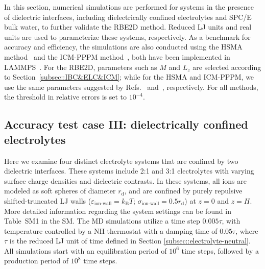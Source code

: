 In this section, numerical simulations are performed for systems in the presence of dielectric interfaces, including dielectrically confined electrolytes and SPC/E bulk water, to further validate the RBE2D method.  {Reduced LJ units and real units are used to parameterize these systems, respectively.}
As a benchmark for accuracy and efficiency, the simulations are also  conducted using the HSMA method~\cite{liang2020harmonic} and the ICM-PPPM method~\cite{yuan2021particle}, both have been implemented in LAMMPS~\cite{liang2022hsma}. 
For the RBE2D, parameters such as $M$ and $L_z$ are selected according to Section~\ref{subsec::IBC&ELC&ICM}; while
for the HSMA and ICM-PPPM, we use the same parameters suggested by Refs.~\cite{liang2020harmonic} and~\cite{yuan2021particle}, respectively. For all methods, the threshold in  relative errors is set to $10^{-4}$.

\subsection{Accuracy test case III: dielectrically confined electrolytes}

Here we examine four distinct electrolyte systems that are confined by two dielectric interfaces.
These systems include 2:1 and 3:1 electrolytes with varying surface charge densities and dielectric contrasts.
In these systems, all ions are modeled as soft spheres of diameter $r_{\text{d}}$, and are confined by purely repulsive shifted-truncated LJ walls ($\varepsilon_{\text{ion-wall}}=k_{\text{B}}T$; $\sigma_{\text{ion-wall}}=0.5r_{\text{d}}$) at $z=0$ and $z=H$. More detailed information regarding the system settings can be found in Table~SM1 in the SM. 
The MD simulations utilize a time step $0.005\tau$, with temperature controlled by a NH thermostat %
with a damping time of $0.05\tau$,  {where $\tau$ is the reduced LJ unit of time defined in Section \ref{subsec::electrolyte-neutral}}.
All simulations start with an equilibration period of $10^6$ time steps, followed by a production period of $10^8$ time steps.


